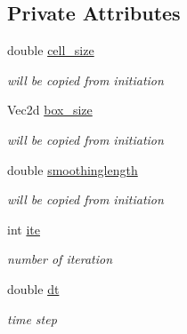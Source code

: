 \subsection*{Private Attributes}
\begin{CompactItemize}
\item 
\hypertarget{classTimeSolver_6650fefd2ce17fe4b84c21d2cf84b3c0}{
double \hyperlink{classTimeSolver_6650fefd2ce17fe4b84c21d2cf84b3c0}{cell\_\-size}}
\label{classTimeSolver_6650fefd2ce17fe4b84c21d2cf84b3c0}

\begin{CompactList}\small\item\em will be copied from initiation \item\end{CompactList}\item 
\hypertarget{classTimeSolver_091ff25ed4144106f86ec1b0043a2b00}{
Vec2d \hyperlink{classTimeSolver_091ff25ed4144106f86ec1b0043a2b00}{box\_\-size}}
\label{classTimeSolver_091ff25ed4144106f86ec1b0043a2b00}

\begin{CompactList}\small\item\em will be copied from initiation \item\end{CompactList}\item 
\hypertarget{classTimeSolver_8a435c6de2503a8cd74868e19a9ed099}{
double \hyperlink{classTimeSolver_8a435c6de2503a8cd74868e19a9ed099}{smoothinglength}}
\label{classTimeSolver_8a435c6de2503a8cd74868e19a9ed099}

\begin{CompactList}\small\item\em will be copied from initiation \item\end{CompactList}\item 
\hypertarget{classTimeSolver_059eae3a0771b4d3201aea0aef1aaee4}{
int \hyperlink{classTimeSolver_059eae3a0771b4d3201aea0aef1aaee4}{ite}}
\label{classTimeSolver_059eae3a0771b4d3201aea0aef1aaee4}

\begin{CompactList}\small\item\em number of iteration \item\end{CompactList}\item 
\hypertarget{classTimeSolver_66c0a9afc7f8fbc205e4ce4de9435aed}{
double \hyperlink{classTimeSolver_66c0a9afc7f8fbc205e4ce4de9435aed}{dt}}
\label{classTimeSolver_66c0a9afc7f8fbc205e4ce4de9435aed}

\begin{CompactList}\small\item\em time step \item\end{CompactList}\end{CompactItemize}


